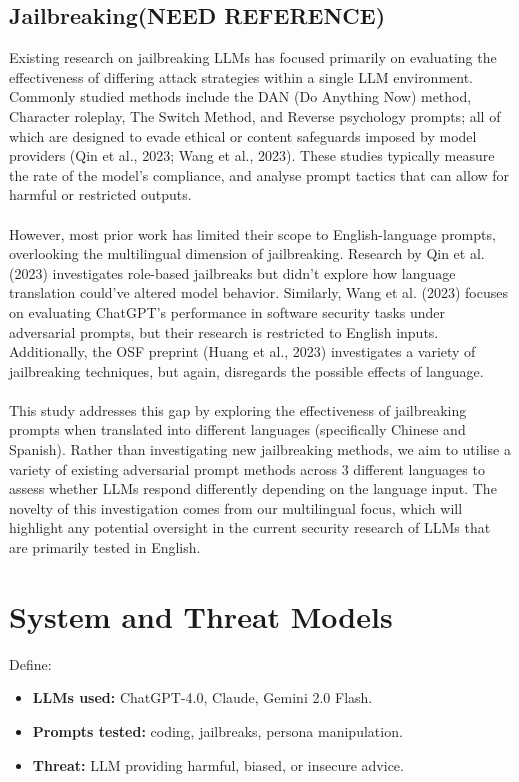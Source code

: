 \documentclass[sigconf]{acmart}
\begin{document}
\subsection{Jailbreaking(NEED REFERENCE)}
Existing research on jailbreaking LLMs has focused primarily on evaluating the effectiveness of differing attack strategies within a single LLM environment. Commonly studied methods include the DAN (Do Anything Now) method, Character roleplay, The Switch Method, and Reverse psychology prompts; all of which are designed to evade ethical or content safeguards imposed by model providers (Qin et al., 2023; Wang et al., 2023). These studies typically measure the rate of the model’s compliance, and analyse prompt tactics that can allow for harmful or restricted outputs.
\\\\
However, most prior work has limited their scope to English-language prompts, overlooking the multilingual dimension of jailbreaking. Research by Qin et al. (2023) investigates role-based jailbreaks but didn’t explore how language translation could’ve altered model behavior. Similarly, Wang et al. (2023) focuses on evaluating ChatGPT's performance in software security tasks under adversarial prompts, but their research is restricted to English inputs. Additionally, the OSF preprint (Huang et al., 2023) investigates a variety of jailbreaking techniques, but again, disregards the possible effects of language.
\\\\
This study addresses this gap by exploring the effectiveness of jailbreaking prompts when translated into different languages (specifically Chinese and Spanish). Rather than investigating new jailbreaking methods, we aim to utilise a variety of existing adversarial prompt methods across 3 different languages to assess whether LLMs respond differently depending on the language input. The novelty of this investigation comes from our multilingual focus, which will highlight any potential oversight in the current security research of LLMs that are primarily tested in English.



\section{System and Threat Models}
Define:
\begin{itemize}
  \item \textbf{LLMs used:} ChatGPT-4.0, Claude, Gemini 2.0 Flash.
  \item \textbf{Prompts tested:} coding, jailbreaks, persona manipulation.
  \item \textbf{Threat:} LLM providing harmful, biased, or insecure advice.
\end{itemize}
\end{document}
